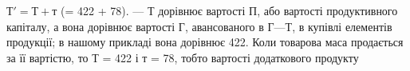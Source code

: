 $Т' = Т + т$ (= 422 + 78). — $Т$ дорівнює вартості $П$,
або вартості продуктивного капіталу, а вона дорівнює вартості $Г$, авансованого
в $Г — Т$, в купівлі елементів продукції; в нашому прикладі вона
дорівнює 422. Коли товарова маса продається за її вартістю, то
$Т$ = 422 і $т$ = 78, тобто вартості додаткового продукту
\parbreak{}  %
